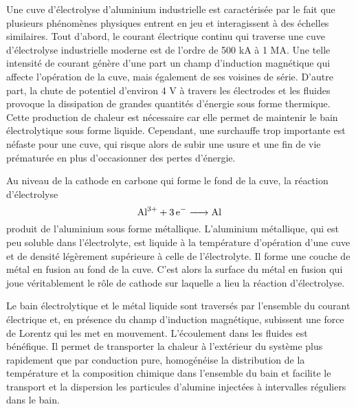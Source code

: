 Une cuve d'électrolyse d'aluminium industrielle est caractérisée par
le fait que plusieurs phénomènes physiques entrent en jeu et
interagissent à des échelles similaires. Tout d'abord, le courant
électrique continu qui traverse une cuve d'électrolyse industrielle
moderne est de l'ordre de \num{500} \si{\kilo\ampere} à \num{1}
\si{\mega\ampere}. Une telle intensité de courant génère d'une part un
champ d'induction magnétique qui affecte l'opération de la cuve, mais
également de ses voisines de série. D'autre part, la chute de
potentiel d'environ \num{4} \si{\volt} à travers les électrodes et les
fluides \cite{Haupin1995} provoque la dissipation de grandes quantités
d'énergie sous forme thermique. Cette production de chaleur est
nécessaire car elle permet de maintenir le bain électrolytique sous
forme liquide. Cependant, une surchauffe trop importante est néfaste
pour une cuve, qui risque alors de subir une usure et une fin de vie
prématurée en plus d'occasionner des pertes d'énergie.

Au niveau de la cathode en carbone qui forme le fond de la cuve, la
réaction d'électrolyse
\begin{equation}
\cee{Al^{3+} + 3e^- -> Al}
\end{equation}
produit de l'aluminium sous forme métallique. L'aluminium métallique,
qui est peu soluble dans l'électrolyte, est liquide à la température
d'opération d'une cuve et de densité légèrement supérieure à celle de
l'électrolyte. Il forme une couche de métal en fusion au fond de la
cuve. C'est alors la surface du métal en fusion qui joue véritablement
le rôle de cathode sur laquelle a lieu la réaction d'électrolyse.

Le bain électrolytique et le métal liquide sont traversés par
l'ensemble du courant électrique et, en présence du champ d'induction
magnétique, subissent une force de Lorentz qui les met en
mouvement. L'écoulement dans les fluides est bénéfique. Il permet de
transporter la chaleur à l'extérieur du système plus rapidement que
par conduction pure, homogénéise la distribution de la température et
la composition chimique dans l'ensemble du bain et facilite le
transport et la dispersion les particules d'alumine injectées à
intervalles réguliers dans le bain.

